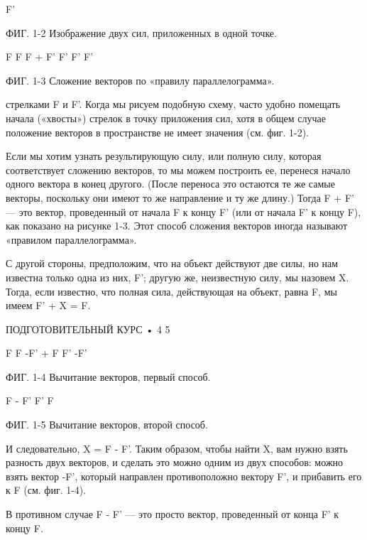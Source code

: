 \documentclass[10pt,oneside]{article}
\begin{document}
F'\par

ФИГ. 1-2 Изображение двух сил, приложенных в одной точке.\par

F F F + F' F' F' F'\par

ФИГ. 1-3 Сложение векторов по «правилу параллелограмма».\par

стрелками F и F'. Когда мы рисуем подобную схему, часто удобно помещать начала («хвосты») стрелок в точку приложения сил, хотя в общем случае положение векторов в пространстве не имеет значения (см. фиг. 1-2).\par

Если мы хотим узнать результирующую силу, или полную силу, которая соответствует сложению векторов, то мы можем построить ее, перенеся начало одного вектора в конец другого. (После переноса это остаются те же самые векторы, поскольку они имеют то же направление и ту же длину.) Тогда F + F' --- это вектор, проведенный от начала F к концу F' (или от начала F' к концу F), как показано на рисунке 1-3. Этот способ сложения векторов иногда называют «правилом параллелограмма».\par

С другой стороны, предположим, что на объект действуют две силы, но нам известна только одна из них, F'; другую же, неизвестную силу, мы назовем X. Тогда, если известно, что полная сила, действующая на объект, равна F, мы имеем F' + X = F.\par

ПОДГОТОВИТЕЛЬНЫЙ КУРС • 4 5\par

F F -F' + F F' -F'\par

ФИГ. 1-4 Вычитание векторов, первый способ.\par

F - F' F' F\par

ФИГ. 1-5 Вычитание векторов, второй способ.\par

И следовательно, X = F - F'. Таким образом, чтобы найти X, вам нужно взять разность двух векторов, и сделать это можно одним из двух способов: можно взять вектор -F', который направлен противоположно вектору F', и прибавить его к F (см. фиг. 1-4).\par

В противном случае F - F' --- это просто вектор, проведенный от конца F' к концу F.\par
\end{document}
